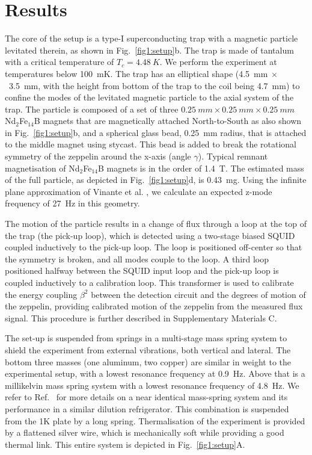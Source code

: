 \documentclass[pdflatex,sn-mathphys]{sn-jnl}
\begin{document}
\section{Results}\label{sec:setup}
    The core of the setup is a type-I superconducting trap with a magnetic particle levitated therein, as shown in Fig.~\ref{fig1:setup}b.
    The trap is made of tantalum with a critical temperature of $T_c = \SI{4.48}{K}$. We perform the experiment at temperatures below \SI{100}{mK}.
    The trap has an elliptical shape (\SI{4.5}{mm}$~\times$~\SI{3.5}{mm}, with the height from bottom of the trap to the coil being \SI{4.7}{mm}) to confine the modes of the levitated magnetic particle to the axial system of the trap.
    The particle is composed of a set of three $\SI{0.25}{mm} \times \SI{0.25}{mm} \times \SI{0.25}{mm}$ Nd$_{2}$Fe$_{14}$B magnets that are magnetically attached North-to-South as also shown in Fig.~\ref{fig1:setup}b, and a spherical glass bead, \SI{0.25}{mm} radius, that is attached to the middle magnet using stycast. This bead is added to break the rotational symmetry of the zeppelin around the x-axis (angle $\gamma$).
    Typical remnant magnetisation of Nd$_{2}$Fe$_{14}$B magnets is in the order of \SI{1.4}{T}.
    The estimated mass of the full particle, as depicted in Fig.~\ref{fig1:setup}d, is \SI{0.43}{mg}.
    Using the infinite plane approximation of Vinante et al. \cite{vinante2020}, we calculate an expected z-mode frequency of \SI{27}{Hz} in this geometry.
    
    The motion of the particle results in a change of flux through a loop at the top of the trap (the pick-up loop), which is detected using a two-stage biased SQUID coupled inductively to the pick-up loop. The loop is positioned off-center so that the symmetry is broken, and all modes couple to the loop.
    A third loop positioned halfway between the SQUID input loop and the pick-up loop is coupled inductively to a calibration loop. This transformer is used to calibrate the energy coupling $\beta^2$ between the detection circuit and the degrees of motion of the zeppelin, providing calibrated motion of the zeppelin from the measured flux signal.
    This procedure is further described in Supplementary Materials C.
    
    The set-up is suspended from springs in a multi-stage mass spring system to shield the experiment from external vibrations, both vertical and lateral.
    The bottom three masses (one aluminum, two copper) are similar in weight to the experimental setup, with a lowest resonance frequency at \SI{0.9}{Hz}.
    Above that is a millikelvin mass spring system with a lowest resonance frequency of \SI{4.8}{Hz}.
    We refer to Ref.~\cite{wit2019} for more details on a near identical mass-spring system and its performance in a similar dilution refrigerator.
    This combination is suspended from the 1K plate by a long spring. 
    Thermalisation of the experiment is provided by a flattened silver wire, which is mechanically soft while providing a good thermal link.
    This entire system is depicted in Fig.~\ref{fig1:setup}A. 
    
\end{document}
